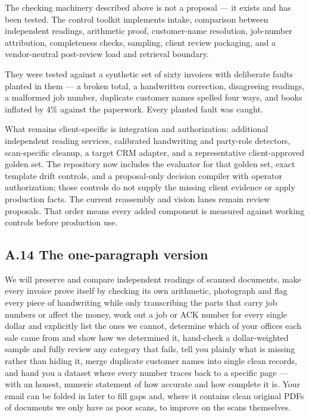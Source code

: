 \documentclass[
]{article}
\begin{document}
The checking machinery described above is not a proposal --- it exists
and has been tested. The control toolkit implements intake, comparison
between independent readings, arithmetic proof, customer-name
resolution, job-number attribution, completeness checks, sampling,
client review packaging, and a vendor-neutral post-review load and
retrieval boundary.

They were tested against a synthetic set of sixty invoices with
deliberate faults planted in them --- a broken total, a handwritten
correction, disagreeing readings, a malformed job number, duplicate
customer names spelled four ways, and books inflated by 4\% against the
paperwork. Every planted fault was caught.

What remains client-specific is integration and authorization:
additional independent reading services, calibrated handwriting and
party-role detectors, scan-specific cleanup, a target CRM adapter, and a
representative client-approved golden set. The repository now includes
the evaluator for that golden set, exact template drift controls, and a
proposal-only decision compiler with operator authorization; those
controls do not supply the missing client evidence or apply production
facts. The current reassembly and vision lanes remain review proposals.
That order means every added component is measured against working
controls before production use.

\subsection{A.14 The one-paragraph
version}\label{a.14-the-one-paragraph-version}

We will preserve and compare independent readings of scanned documents,
make every invoice prove itself by checking its own arithmetic,
photograph and flag every piece of handwriting while only transcribing
the parts that carry job numbers or affect the money, work out a job or
ACK number for every single dollar and explicitly list the ones we
cannot, determine which of your offices each sale came from and show how
we determined it, hand-check a dollar-weighted sample and fully review
any category that fails, tell you plainly what is missing rather than
hiding it, merge duplicate customer names into single clean records, and
hand you a dataset where every number traces back to a specific page ---
with an honest, numeric statement of how accurate and how complete it
is. Your email can be folded in later to fill gaps and, where it
contains clean original PDFs of documents we only have as poor scans, to
improve on the scans themselves.
\end{document}
